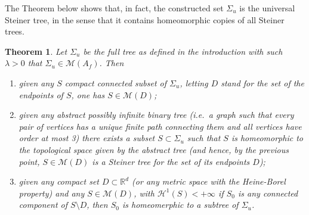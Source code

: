 \documentclass{amsart}
\newcommand{\RR}{\mathbb R}
\renewcommand{\H}{\mathcal H}
\newcommand{\M}{\mathcal{M}}
\renewcommand{\H}{\mathcal{H}}
\newtheorem{theorem}{Theorem}[section]
\theoremstyle{definition}
\theoremstyle{remark}
\begin{document}
The Theorem below shows that, in fact, the constructed set 
$\Sigma_u$ is the universal Steiner tree, 
in the sense that it contains homeomorphic copies of all 
Steiner trees.

\begin{theorem}
Let $\Sigma_u$ be the full tree as defined in the introduction
with such $\lambda>0$ that $\Sigma_u\in \M(A_f)$.
Then
\begin{enumerate}
  \item[(i)]
given any $S$ compact connected subset of $\Sigma_u$, 
letting $D$ stand for the set of the endpoints of $S$,
one has $S\in \M(D)$;
  \item[(ii)]
given any abstract possibly infinite binary tree (i.e.\ a graph 
such that every pair of vertices has a unique finite path connecting them and all vertices 
have order at most 3) 
there exists a subset $S\subset \Sigma_u$
such that $S$ is homeomorphic to the topological space given by the abstract tree 
(and hence, by the previous point, $S\in \M(D)$ is a Steiner tree for 
the set of its endpoints $D$);
  \item[(iii)] given any compact set $D\subset \RR^d$ 
  (or any metric space with the Heine-Borel property) 
  and any $S\in \M(D)$, with $\H^1(S)<+\infty$ if $S_0$ 
  is any connected component of $S\setminus D$, 
  then $S_0$ is homeomerphic to a subtree of $\Sigma_u$.
\end{enumerate}
\end{theorem}
%
\end{document}

